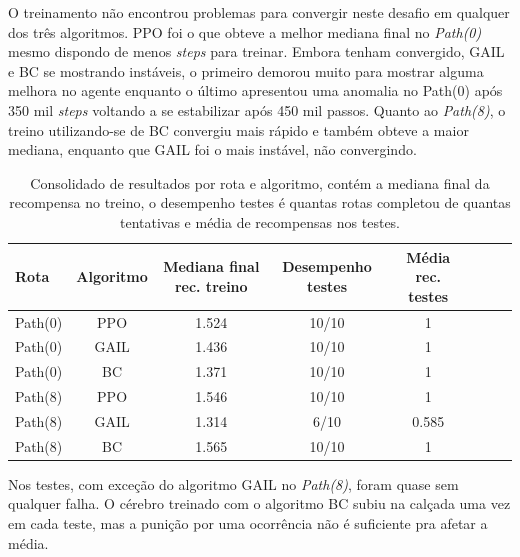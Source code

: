 O treinamento não encontrou problemas para convergir neste desafio em qualquer dos três algoritmos. PPO foi o que obteve a melhor mediana final no \textit{Path(0)} mesmo dispondo de menos \textit{steps} para treinar. Embora tenham convergido, GAIL e BC se mostrando instáveis, o primeiro demorou muito para mostrar alguma melhora no agente enquanto o último apresentou uma anomalia no Path(0) após 350 mil \textit{steps} voltando a se estabilizar após 450 mil passos. Quanto ao \textit{Path(8)}, o treino utilizando-se de BC convergiu mais rápido e também obteve a maior mediana, enquanto que GAIL foi o mais instável, não convergindo.

\begin{table}[htpb]
    \centering
    \caption{Consolidado de resultados por rota e algoritmo, contém a mediana final da recompensa no treino, o desempenho testes é quantas rotas completou de quantas tentativas e média de recompensas nos testes.}
    \label{resultado-tabela-desafio-1}
    \begin{tabular}{|l|c|c|c|c|c|c|r|}
         \hline
         \small{Rota} & \small{Algoritmo}   & \small{Mediana final rec. treino}  & \small{Desempenho testes}    & \small{Média rec. testes} \\ \hline
            Path(0)   &      PPO            &   1.524                            &    10/10                     &      1                    \\ \hline
            Path(0)   &      GAIL           &   1.436                            &    10/10                     &      1                    \\ \hline
            Path(0)   &      BC             &   1.371                            &    10/10                     &      1                    \\ \hline
            Path(8)   &      PPO            &   1.546                            &    10/10                     &      1                    \\ \hline
            Path(8)   &      GAIL           &   1.314                            &    6/10                      &      0.585                \\ \hline
            Path(8)   &      BC             &   1.565                            &    10/10                     &      1                    \\ \hline
    \end{tabular}
\end{table}


Nos testes, com exceção do algoritmo GAIL no \textit{Path(8)}, foram quase sem qualquer falha. O  cérebro treinado com o algoritmo BC subiu na calçada uma vez em cada teste, mas a punição por uma ocorrência não é suficiente pra afetar a média.

